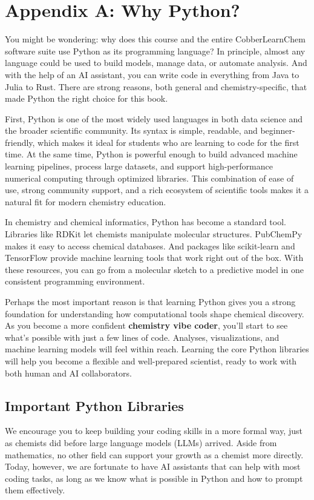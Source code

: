 \chapter*{Appendix A: Why Python?}
You might be wondering: why does this course and the entire CobberLearnChem software suite use Python as its programming language? In principle, almost any language could be used to build models, manage data, or automate analysis. And with the help of an AI assistant, you can write code in everything from Java to Julia to Rust. There are strong reasons, both general and chemistry-specific, that made Python the right choice for this book.

First, Python is one of the most widely used languages in both data science and the broader scientific community. Its syntax is simple, readable, and beginner-friendly, which makes it ideal for students who are learning to code for the first time. At the same time, Python is powerful enough to build advanced machine learning pipelines, process large datasets, and support high-performance numerical computing through optimized libraries. This combination of ease of use, strong community support, and a rich ecosystem of scientific tools makes it a natural fit for modern chemistry education.

In chemistry and chemical informatics, Python has become a standard tool. Libraries like RDKit let chemists manipulate molecular structures. PubChemPy makes it easy to access chemical databases. And packages like scikit-learn and TensorFlow provide machine learning tools that work right out of the box. With these resources, you can go from a molecular sketch to a predictive model in one consistent programming environment.

Perhaps the most important reason is that learning Python gives you a strong foundation for understanding how computational tools shape chemical discovery. As you become a more confident \textbf{chemistry vibe coder}, you’ll start to see what’s possible with just a few lines of code. Analyses, visualizations, and machine learning models will feel within reach. Learning the core Python libraries will help you become a flexible and well-prepared scientist, ready to work with both human and AI collaborators.


\section{Important Python Libraries}
We encourage you to keep building your coding skills in a more formal way, just as chemists did before large language models (LLMs) arrived. Aside from mathematics, no other field can support your growth as a chemist more directly. Today, however, we are fortunate to have AI assistants that can help with most coding tasks, as long as we know what is possible in Python and how to prompt them effectively.

